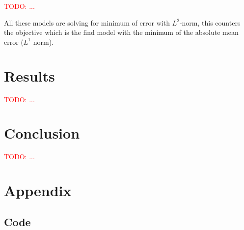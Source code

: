 \documentclass[a4paper]{article}
\newcommand\todo[1]{\textcolor{red}{TODO: #1}}
\begin{document}
\todo{...}

All these models are solving for minimum of error with $L^2$-norm, this counters the objective which is the find model with the minimum of the absolute mean error ($L^1$-norm).


%

\section{Results}
\todo{...}




\section{Conclusion}
\todo{...}


\newpage
\appendix
\section{Appendix}

\subsection{Code}
\label{sec:code}


\label{sec:output}


\end{document}
